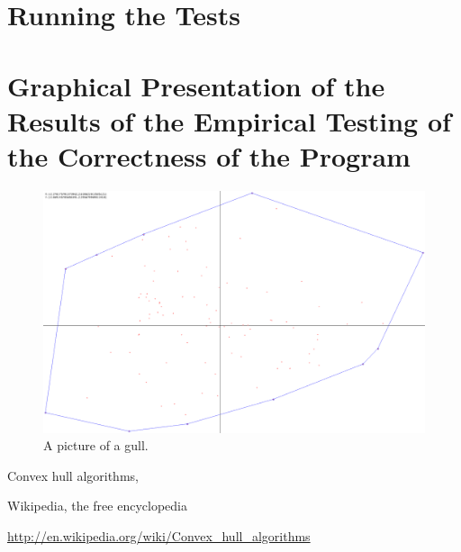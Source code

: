 \documentclass[a4paper,12pt,leqno,titlepage]{article}
\begin{document}
\pagebreak
\section{Running the Tests}

\pagebreak
\section{Graphical Presentation of the Results of the Empirical Testing of the Correctness of the Program}
\begin{figure}[h!]
\caption{A picture of a gull.} %
\centering
\includegraphics[width=\textwidth]{gull.png}
\end{figure}

\pagebreak


\begin{thebibliography}{9}

Convex hull algorithms,

Wikipedia, the free encyclopedia

\url{http://en.wikipedia.org/wiki/Convex_hull_algorithms}


\end{thebibliography}
\end{document}
